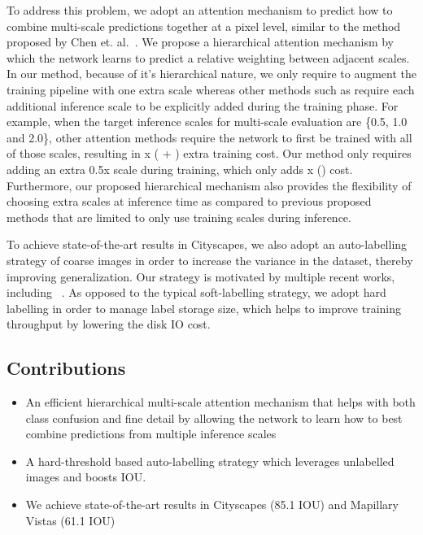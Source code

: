 \documentclass{article}
\begin{document}
To address this problem, we adopt an attention mechanism to predict how to combine multi-scale predictions together at a pixel level, similar to the method proposed by Chen et. al.~\cite{chen2015attention}. We propose a hierarchical attention mechanism by which the network learns to predict a relative weighting between adjacent scales. In our method, because of it's hierarchical nature, we only require to augment the training pipeline with one extra scale whereas other methods such as \cite{chen2015attention} require each additional inference scale to be explicitly added during the training phase. For example, when the target inference scales for multi-scale evaluation are \{0.5, 1.0 and 2.0\}, other attention methods require the network to first be trained with all of those scales, resulting in x ( + ) extra training cost.  Our method only requires adding an extra 0.5x scale during training, which only adds x () cost. Furthermore, our proposed hierarchical mechanism also provides the flexibility of choosing extra scales at inference time as compared to previous proposed methods that are limited to only use training scales during inference.

To achieve state-of-the-art results in Cityscapes, we also adopt an auto-labelling strategy of coarse images in order to increase the variance in the dataset, thereby improving generalization. Our strategy is motivated by multiple recent works, including ~\cite{xie2019selftraining,arazo2019pseudo,lee2013pseudo}. As opposed to the typical soft-labelling strategy, we adopt hard labelling in order to manage label storage size, which helps to improve training throughput by lowering the disk IO cost.


\subsection{Contributions}
\begin{itemize}
\item An efficient hierarchical multi-scale attention mechanism that helps with both class confusion and fine detail by allowing the network to learn how to best combine predictions from multiple inference scales
\item A hard-threshold based auto-labelling strategy which leverages unlabelled images and boosts IOU.
\item We achieve state-of-the-art results in Cityscapes (85.1 IOU) and Mapillary Vistas (61.1 IOU)
\end{itemize}
\end{document}
